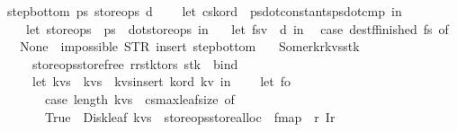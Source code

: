 \begin{isabellebody}
{\isachardoublequoteopen}step{\isacharunderscore}bottom\ ps{}\ store{\isacharunderscore}ops\ d\ {\isacharequal}\ {\isacharparenleft}\isanewline
\ \ let\ {\isacharparenleft}cs{\isacharcomma}k{\isacharunderscore}ord{\isacharparenright}\ {\isacharequal}\ {\isacharparenleft}ps{}{\isacharbar}{\isachargreater}dot{\isacharunderscore}constants{\isacharcomma}ps{}{\isacharbar}{\isachargreater}dot{\isacharunderscore}cmp{\isacharparenright}\ in\isanewline
\ \ {\isacharparenleft}{\isacharasterisk}\ let\ store{\isacharunderscore}ops\ {\isacharequal}\ ps{}\ {\isacharbar}{\isachargreater}\ dot{\isacharunderscore}store{\isacharunderscore}ops\ in\ {\isacharasterisk}{\isacharparenright}\isanewline
\ \ let\ {\isacharparenleft}fs{\isacharcomma}v{\isacharparenright}\ {\isacharequal}\ d\ in\isanewline
\ \ case\ dest{\isacharunderscore}f{\isacharunderscore}finished\ fs\ of\ \isanewline
\ \ None\ {\isasymRightarrow}\ impossible{}\ {\isacharparenleft}STR\ {\isacharprime}{\isacharprime}insert{\isacharcomma}\ step{\isacharunderscore}bottom{\isacharprime}{\isacharprime}{\isacharparenright}\isanewline
\ \ {\isacharbar}\ Some{\isacharparenleft}r{}{\isacharcomma}k{\isacharcomma}r{\isacharcomma}kvs{\isacharcomma}stk{\isacharparenright}\ {\isasymRightarrow}\ {\isacharparenleft}\isanewline
\ \ \ \ {\isacharparenleft}store{\isacharunderscore}ops{\isacharbar}{\isachargreater}store{\isacharunderscore}free{\isacharparenright}\ {\isacharparenleft}r{}{\isacharhash}{\isacharparenleft}r{\isacharunderscore}stk{\isacharunderscore}to{\isacharunderscore}rs\ stk{\isacharparenright}{\isacharparenright}\ {\isacharbar}{\isachargreater}\ bind\ {\isacharparenleft}{\isacharpercent}\ {\isacharunderscore}{\isachardot}\isanewline
\ \ \ \ let\ kvs{\isacharprime}\ {\isacharequal}\ kvs\ {\isacharbar}{\isachargreater}\ kvs{\isacharunderscore}insert\ k{\isacharunderscore}ord\ {\isacharparenleft}k{\isacharcomma}v{\isacharparenright}\ in\isanewline
\ \ \ \ let\ fo\ {\isacharequal}\ {\isacharparenleft}\isanewline
\ \ \ \ \ \ case\ {\isacharparenleft}length\ kvs{\isacharprime}\ {\isasymle}\ {\isacharparenleft}cs{\isacharbar}{\isachargreater}max{\isacharunderscore}leaf{\isacharunderscore}size{\isacharparenright}{\isacharparenright}\ of\isanewline
\ \ \ \ \ \ True\ {\isasymRightarrow}\ {\isacharparenleft}Disk{\isacharunderscore}leaf\ kvs{\isacharprime}\ {\isacharbar}{\isachargreater}\ {\isacharparenleft}store{\isacharunderscore}ops{\isacharbar}{\isachargreater}store{\isacharunderscore}alloc{\isacharparenright}\ {\isacharbar}{\isachargreater}\ fmap\ {\isacharparenleft}{\isacharpercent}\ r{\isacharprime}{\isachardot}\ I{}{\isacharparenleft}r{\isacharprime}{\isacharparenright}{\isacharparenright}{\isacharparenright}\isanewline

\end{isabellebody}
